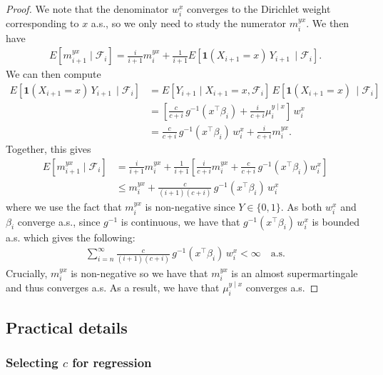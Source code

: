 \documentclass[11pt,a4paper]{article}
\theoremstyle{plain}
\theoremstyle{remark}
\theoremstyle{remark}
\begin{document}
\begin{proof}
We note that the denominator $w_i^x$ converges to the Dirichlet weight corresponding to $x$ a.s., so we only need to study the numerator $m_i^{yx}$.
We then have
\begin{align*}
E\left[{m}_{i+1}^{yx}\mid  \mathcal{F}_i\right] = \frac{i}{i+1}  {m}_i^{yx} + \frac{1}{i+1} E\left[\mathbf{1}(X_{i+1} = x)\, Y_{i+1}\,\mid \mathcal{F}_i\right].
\end{align*}
We can then compute
\begin{align*}
    E\left[\mathbf{1}(X_{i+1} = x)\, Y_{i+1}\,\mid \mathcal{F}_i\right] &= E\left[Y_{i+1} \mid X_{i+1} = x, \mathcal{F}_i\right]\, E\left[\mathbf{1}(X_{i+1} = x)\,\mid \mathcal{F}_i\right]\\
    &= 
    \left[\frac{c}{c+i}\, g^{-1}(x^\top  \beta_i) + \frac{i}{c+i} {\mu}_i^{y \mid x}\right]\, w_i^x\\
    &= \frac{c}{c+i}\, g^{-1}(x^\top  \beta_i)\, w_i^x + \frac{i}{c+i} {m}_i^{yx}.
\end{align*}
Together, this gives
\begin{align*}
    E\left[{m}_{i+1}^{yx}\mid  \mathcal{F}_i\right] &= \frac{i}{i+1}  {m}_i^{yx} + \frac{1}{i+1}\left[\frac{i}{c+i}{m}_i^{yx} + \frac{c}{c+i}\, g^{-1}(x^\top \beta_i) w_i^x\right] \\
    &\leq {m}_i^{yx} + \frac{c}{(i+1)(c+i)}\, g^{-1}(x^\top \beta_i)\, w_i^x
\end{align*}
where we use the fact that $m_i^{yx}$ is non-negative since $Y\in \{0,1\}$. As both $w_i^x$ and $\beta_i$ converge a.s., since $g^{-1}$ is continuous, we have that $g^{-1}(x^\top \beta_i)\, w_i^x$ is bounded a.s. which gives the following:
\begin{align*}
    \sum_{i = n}^\infty  \frac{c}{(i+1)(c+i)}\, g^{-1}(x^\top \beta_i)\, w_i^x < \infty \quad \text{a.s.}
\end{align*}
Crucially, ${m}_i^{yx}$ is non-negative so we have that ${m}_i^{yx}$ is an almost supermartingale and thus converges a.s. As a result, we have that $\mu_i^{y \mid x}$ converges a.s.
\end{proof}



\subsection{Practical details}\label{sec:app_regprac}
\subsubsection{Selecting $c$ for regression}\label{sec:app_regc}
\end{document}
